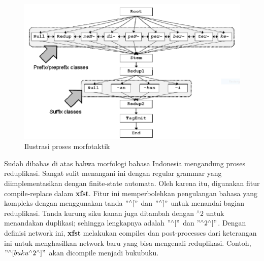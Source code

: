 \begin{figure}[H]
\centering
\includegraphics[scale=0.5]{Gambar/gambar-fsa-morfotaktik}
\caption[Ilustrasi proses morfotaktik]{Ilustrasi proses morfotaktik\cite{manurung:08:indonesian}} 
\label{gambar-fsa-morfotaktik}
\end{figure}



Sudah dibahas di atas bahwa morfologi bahasa Indonesia mengandung proses reduplikasi. Sangat sulit menangani ini dengan regular grammar yang diimplementasikan dengan finite-state automata. Oleh karena itu, digunakan fitur compile-replace dalam \textbf{xfst}. Fitur ini memperbolehkan pengulangan bahasa yang kompleks dengan menggunakan tanda $"^{\wedge}["$ dan $"^{\wedge}]"$ untuk menandai bagian reduplikasi. Tanda kurung siku kanan juga ditambah dengan $^{\wedge}2$ untuk menandakan duplikasi; sehingga lengkapnya adalah $"^{\wedge}["$ dan $"^{\wedge}2^{\wedge}]"$. Dengan definisi network ini, \textbf{xfst} melakukan compiles dan post-processes dari keterangan ini untuk menghasilkan network baru yang bisa mengenali reduplikasi. Contoh, $"^{\wedge}[buku^{\wedge}2^{\wedge}]"$ akan dicompile menjadi bukubuku.

